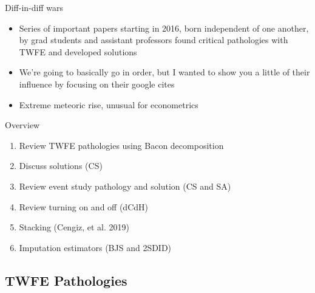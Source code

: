 \documentclass{beamer}
\begin{document}
\begin{frame}{Diff-in-diff wars}

\begin{itemize}
\item Series of important papers starting in 2016, born independent of one another, by grad students and assistant professors found critical pathologies with TWFE and developed solutions
\item We're going to basically go in order, but I wanted to show you a little of their influence by focusing on their google cites
\item Extreme meteoric rise, unusual for econometrics
\end{itemize}

\end{frame}











\begin{frame}{Overview}

\begin{enumerate}
\item Review TWFE pathologies using Bacon decomposition
\item Discuss solutions (CS)
\item Review event study pathology and solution (CS and SA)
\item Review turning on and off (dCdH)
\item Stacking (Cengiz, et al. 2019)
\item Imputation estimators (BJS and 2SDID)
\end{enumerate}

\end{frame}



\subsection{TWFE Pathologies}
\end{document}
